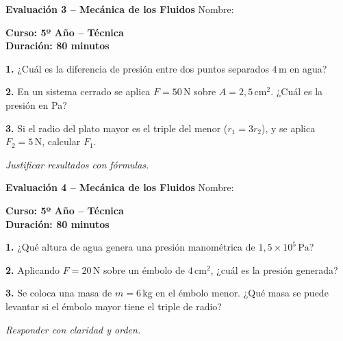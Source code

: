 \documentclass[10pt]{article}
\begin{document}
\begin{minipage}[t][0.23\textheight][t]{0.48\textwidth}
\textbf{Evaluación 3 – Mecánica de los Fluidos} \hfill Nombre: \hrulefill

\vspace{1mm}
\textbf{Curso: 5º Año – Técnica} \\
\textbf{Duración: 80 minutos}

\vspace{2mm}
\textbf{1.} ¿Cuál es la diferencia de presión entre dos puntos separados $4\,\text{m}$ en agua?

\vspace{2mm}
\textbf{2.} En un sistema cerrado se aplica $F=50\,\text{N}$ sobre $A=2{,}5\,\text{cm}^2$. ¿Cuál es la presión en Pa?

\vspace{2mm}
\textbf{3.} Si el radio del plato mayor es el triple del menor ($r_1 = 3 r_2$), y se aplica $F_2=5\,\text{N}$, calcular $F_1$.

\vfill
\textit{Justificar resultados con fórmulas.}
\end{minipage}
\hfill
\begin{minipage}[t][0.23\textheight][t]{0.48\textwidth}
\textbf{Evaluación 4 – Mecánica de los Fluidos} \hfill Nombre: \hrulefill

\vspace{1mm}
\textbf{Curso: 5º Año – Técnica} \\
\textbf{Duración: 80 minutos}

\vspace{2mm}
\textbf{1.} ¿Qué altura de agua genera una presión manométrica de $1{,}5\times10^5\,\text{Pa}$?

\vspace{2mm}
\textbf{2.} Aplicando $F=20\,\text{N}$ sobre un émbolo de $4\,\text{cm}^2$, ¿cuál es la presión generada?

\vspace{2mm}
\textbf{3.} Se coloca una masa de $m=6\,\text{kg}$ en el émbolo menor. ¿Qué masa se puede levantar si el émbolo mayor tiene el triple de radio?

\vfill
\textit{Responder con claridad y orden.}
\end{minipage}
\end{document}
